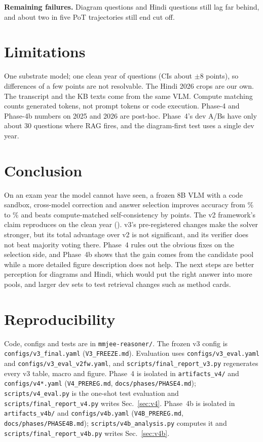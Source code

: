\documentclass[conference]{IEEEtran}
\begin{document}
\textbf{Remaining failures.} Diagram questions and Hindi questions still lag far behind, and
about two in five PoT trajectories still end cut off.

\section{Limitations}
One substrate model; one clean year of \NTest{} questions (CIs about $\pm$8 points), so
differences of a few points are not resolvable. The Hindi 2026 crops are our own. The transcript
and the KB texts come from the same VLM. Compute matching counts generated tokens, not prompt
tokens or code execution. Phase-4 and Phase-4b numbers on 2025 and 2026 are post-hoc. Phase~4's
dev A/Bs have only about 30 questions where RAG fires, and the diagram-first test uses a single
dev year.

\section{Conclusion}
On an exam year the model cannot have seen, a frozen 8B VLM with a code sandbox, cross-model
correction and answer selection improves accuracy from \ThreeBase\% to \ThreeAcc\% and beats
compute-matched self-consistency by \ThreeVsSc{} points. The v2 framework's claim reproduces on
the clean year (\TwoVsSc). v3's pre-registered changes make the solver stronger, but its total
advantage over v2 is not significant, and its verifier does not beat majority voting there.
Phase~4 rules out the obvious fixes on the selection side, and Phase~4b shows that the gain comes
from the candidate pool while a more detailed figure description does not help. The next steps are better perception
for diagrams and Hindi, which would put the right answer into more pools, and larger dev sets to
test retrieval changes such as method cards.

\section*{Reproducibility}
Code, configs and tests are in \texttt{mmjee-reasoner/}. The frozen v3 config is
\texttt{configs/v3\_final.yaml} (\texttt{V3\_FREEZE.md}). Evaluation uses
\texttt{configs/v3\_eval.yaml} and \texttt{configs/v3\_eval\_v2fw.yaml}, and
\texttt{scripts/final\_report\_v3.py} regenerates every v3 table, macro and figure. Phase~4 is
isolated in \texttt{artifacts\_v4/} and \texttt{configs/v4*.yaml} (\texttt{V4\_PREREG.md},
\texttt{docs/phases/PHASE4.md}); \texttt{scripts/v4\_eval.py} is the
one-shot test evaluation and \texttt{scripts/final\_report\_v4.py} writes Sec.~\ref{sec:v4}. Phase~4b is isolated in
\texttt{artifacts\_v4b/} and \texttt{configs/v4b.yaml} (\texttt{V4B\_PREREG.md},
\texttt{docs/phases/PHASE4B.md}); \texttt{scripts/v4b\_analysis.py} computes it and
\texttt{scripts/final\_report\_v4b.py} writes Sec.~\ref{sec:v4b}.
\end{document}

